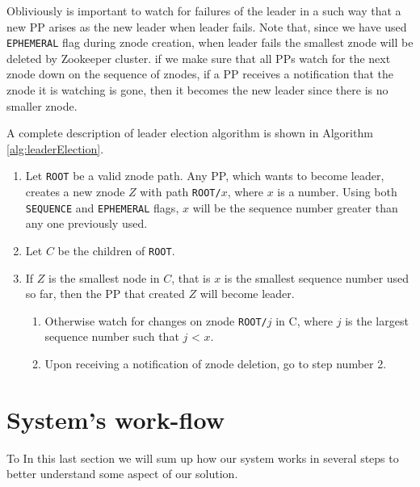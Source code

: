 \documentclass[sigchi]{acmart}
\begin{document}
Obliviously is important to watch for failures of the leader in a such way that a new PP arises as the new leader when leader fails. Note that, since we have used \texttt{EPHEMERAL} flag during znode creation, when leader fails the smallest znode will be deleted by Zookeeper cluster. if we make sure that all PPs watch for the next znode down on the sequence of znodes, if a PP receives a notification that the znode it is watching is gone, then it becomes the new leader since there is no smaller znode. 

A complete description of leader election algorithm is shown in Algorithm \ref{alg:leaderElection}.

\begin{algorithm}
\caption{}\label{alg:leaderElection}
\begin{enumerate}

\item Let \texttt{ROOT} be a valid znode path. Any PP, which wants to become leader, creates a new znode $Z$ with path \texttt{ROOT/$x$}, where $x$ is a number. Using both \texttt{SEQUENCE} and \texttt{EPHEMERAL} flags, $x$ will be the sequence number greater than any one previously used.

\item Let $C$ be the children of \texttt{ROOT}. 

\item If $Z$ is the smallest node in $C$, that is $x$ is the smallest sequence number used so far, then the PP that created $Z$ will become leader.

\begin{enumerate}

\item Otherwise watch for changes on znode \texttt{ROOT/$j$} in C, where $j$ is the largest sequence number such that $j$ < $x$.

\item Upon receiving a notification of znode deletion, go to step number 2. 

\end{enumerate}
\end{enumerate}
\end{algorithm}

\section{System's work-flow}

To In this last section we will sum up how our system works in several steps to better understand some aspect of our solution.
\end{document}
